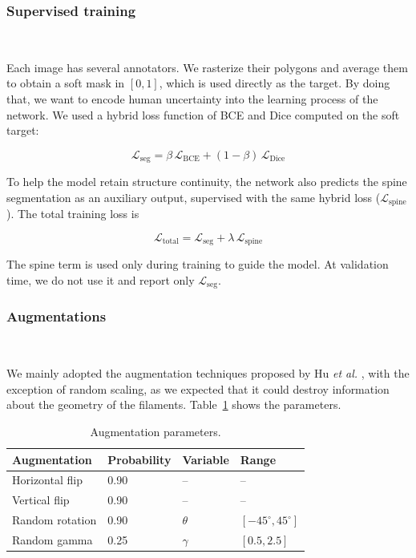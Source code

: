 \documentclass[sigconf]{acmart}
\begin{document}
\subsubsection{Supervised training} \mbox{}\
    
    Each image has several annotators. We rasterize their polygons and average them to obtain a soft mask in $[0,1]$, which is used directly as the target. By doing that, we want to encode human uncertainty into the learning process of the network. We used a hybrid loss function of BCE and Dice computed on the soft target:
    
    \begin{equation}
        \mathcal{L}_\text{seg} = \beta\,\mathcal{L}_\text{BCE} + (1 - \beta)\,\mathcal{L}_\text{Dice}
    \end{equation}
    
    To help the model retain structure continuity, the network also predicts the spine segmentation as an auxiliary output, supervised with the same hybrid loss ($\mathcal{L}_\text{spine}$). The total training loss is
    
    \begin{equation}
        \mathcal{L}_\text{total} = \mathcal{L}_\text{seg} + \lambda\,\mathcal{L}_\text{spine}
    \end{equation}
    
    The spine term is used only during training to guide the model. At validation time, we do not use it and report only $\mathcal{L}_\text{seg}$.

\subsubsection{Augmentations}\mbox{}\

    We mainly adopted the augmentation techniques proposed by Hu \textit{et al.} \cite{hu2026modernconvnetsolarfilament}, with the exception of random scaling, as we expected that it could destroy information about the geometry of the filaments. Table~\ref{tab:augmentation} shows the parameters.

\begin{table}[H]
    \centering
    \caption{Augmentation parameters.}
    \label{tab:augmentation}
    \footnotesize
    \renewcommand{\arraystretch}{1.12}
    \setlength{\tabcolsep}{4pt}
    \begin{tabular}{@{}llll@{}}
        \toprule
        \textbf{Augmentation} & \textbf{Probability} & \textbf{Variable} & \textbf{Range} \\
        \midrule
        Horizontal flip & 0.90 & -- & -- \\
        Vertical flip   & 0.90 & -- & -- \\
        Random rotation & 0.90 & $\theta$ & $[-45^\circ, 45^\circ]$ \\
        Random gamma    & 0.25 & $\gamma$ & $[0.5, 2.5]$ \\
        \bottomrule
    \end{tabular}
\end{table}
\end{document}
